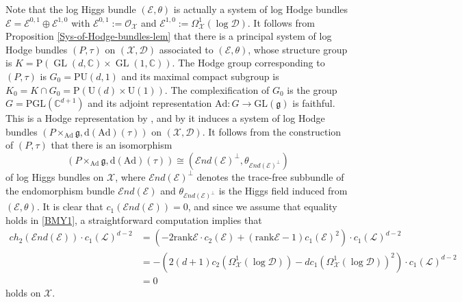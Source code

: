 \documentclass[a4paper]{amsart}
\theoremstyle{definition}
\def\gl{\mathop{\mathrm{GL}}\nolimits}
\begin{document}
Note that the log Higgs bundle $(\mathcal{E},\theta)$ is actually a system of log Hodge bundles $\mathcal{E}=\mathcal{E}^{0,1}\oplus\mathcal{E}^{1,0}$ with $\mathcal{E}^{0,1}:=\mathcal{O}_\mathscr{X}$ and $\mathcal{E}^{1,0}:=\Omega^1_{\mathscr{X}}(\log \mathscr{D})$. It follows from Proposition \ref{Sys-of-Hodge-bundles-lem} that there is a principal system of log Hodge bundles $(P,\tau)$ on $(\mathscr{X},\mathscr{D})$ associated to $(\mathcal{E},\theta)$, whose structure group is $K=\mathrm{P}(\gl(d,\mathbb{C})\times\gl(1,\mathbb{C}))$. The Hodge group corresponding to $(P,\tau)$ is $G_0=\mathrm{PU}(d,1)$ and its maximal compact subgroup is $K_0=K\cap G_0=\mathrm{P}(\mathrm{U}(d)\times\mathrm{U}(1))$. The complexification of $G_0$ is the group $G=\mathrm{PGL}(\mathbb{C}^{d+1})$ and its adjoint representation $\mathrm{Ad}:G\to\mathrm{GL}(\mathfrak{g})$ is faithful. This is a Hodge representation by \cite[Example 3.9]{dengcadorel}, and by \cite[Example 3.10]{dengcadorel} it induces a system of log Hodge bundles $(P\times_{\mathrm{Ad}}\mathfrak{g},\mathrm{d}(\mathrm{Ad})(\tau))$ on $(\mathscr{X},\mathscr{D})$. It follows from the construction of $(P,\tau)$ that there is an isomorphism
\[
(P\times_{\mathrm{Ad}}\mathfrak{g},\mathrm{d}(\mathrm{Ad})(\tau))\cong(\mathcal{E}nd(\mathcal{E})^\perp,\theta_{\mathcal{E}nd(\mathcal{E})^\perp})
\]
of log Higgs bundles on $\mathscr{X}$, where $\mathcal{E}nd(\mathcal{E})^\perp$ denotes the trace-free subbundle of the endomorphism bundle $\mathcal{E}nd(\mathcal{E})$ and $\theta_{\mathcal{E}nd(\mathcal{E})^\perp}$ is the Higgs field induced from $(\mathcal{E},\theta)$. 
It is clear that $c_1(\mathcal{E}nd(\mathcal{E}))=0$, and since we assume that equality holds in \ref{BMY1}, a straightforward computation implies that 
\begin{align*}
ch_2(\mathcal{E}nd(\mathcal{E}))\cdot c_1(\mathcal{L})^{d-2}&=(-2\mathrm{rank}\mathcal{E}\cdot c_2(\mathcal{E})+(\mathrm{rank}\mathcal{E}-1)c_1(\mathcal{E})^2)\cdot c_1(\mathcal{L})^{d-2}\\
&=-(2(d+1)c_2(\Omega^1_{\mathscr{X}}(\log \mathscr{D}))-dc_1(\Omega^1_{\mathscr{X}}(\log \mathscr{D}))^2)\cdot c_1(\mathcal{L})^{d-2}\\
&=0
\end{align*}
holds on $\mathscr{X}$.
\end{document}
